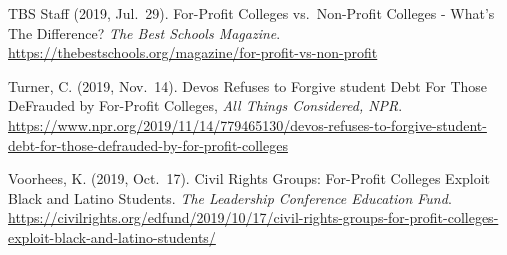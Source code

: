 \documentclass[
]{article}
\begin{document}
TBS Staff (2019, Jul.~29). For-Profit Colleges vs.~Non-Profit Colleges -
What's The Difference? \emph{The Best Schools Magazine}.
\url{https://thebestschools.org/magazine/for-profit-vs-non-profit}

Turner, C. (2019, Nov.~14). Devos Refuses to Forgive student Debt For
Those DeFrauded by For-Profit Colleges, \emph{All Things Considered,
NPR}.
\url{https://www.npr.org/2019/11/14/779465130/devos-refuses-to-forgive-student-debt-for-those-defrauded-by-for-profit-colleges}

Voorhees, K. (2019, Oct.~17). Civil Rights Groups: For-Profit Colleges
Exploit Black and Latino Students. \emph{The Leadership Conference
Education Fund}.
\url{https://civilrights.org/edfund/2019/10/17/civil-rights-groups-for-profit-colleges-exploit-black-and-latino-students/}
\end{document}
